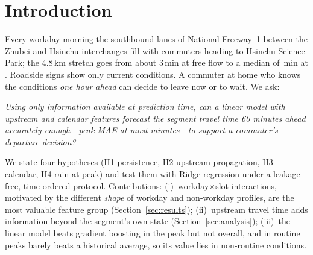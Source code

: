 \section{Introduction}
Every workday morning the southbound lanes of National Freeway~1 between the Zhubei and Hsinchu
interchanges fill with commuters heading to Hsinchu Science Park; the 4.8\,km stretch goes from
about 3\,min at free flow to a median of \,min at
. Roadside signs show only current conditions. A commuter at home who
knows the conditions \emph{one hour ahead} can decide to leave now or to wait. We ask:

\emph{Using only information available at prediction time, can a linear model with upstream and
calendar features forecast the segment travel time 60 minutes ahead accurately enough---peak MAE
at most  minutes---to support a commuter's departure decision?}

We state four hypotheses (H1 persistence, H2 upstream propagation, H3 calendar, H4 rain at peak)
and test them with Ridge regression under a leakage-free, time-ordered protocol. Contributions:
(i)~workday$\times$\allowbreak slot interactions, motivated by the different \emph{shape} of workday
and non-workday profiles, are the most valuable feature group (Section~\ref{sec:results});
(ii)~upstream travel time adds information beyond the segment's own state
(Section~\ref{sec:analysis}); (iii)~the linear model beats gradient boosting in the peak but not
overall, and in routine peaks barely beats a historical average, so its value lies in
non-routine conditions.
